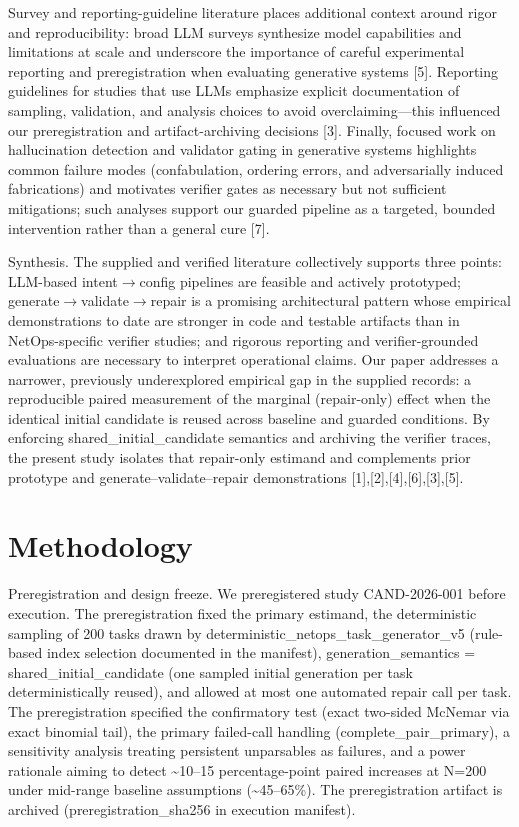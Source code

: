 \documentclass[conference]{IEEEtran}
\begin{document}
Survey and reporting-guideline literature places additional context around rigor and reproducibility: broad LLM surveys synthesize model capabilities and limitations at scale and underscore the importance of careful experimental reporting and preregistration when evaluating generative systems [5]. Reporting guidelines for studies that use LLMs emphasize explicit documentation of sampling, validation, and analysis choices to avoid overclaiming---this influenced our preregistration and artifact-archiving decisions [3]. Finally, focused work on hallucination detection and validator gating in generative systems highlights common failure modes (confabulation, ordering errors, and adversarially induced fabrications) and motivates verifier gates as necessary but not sufficient mitigations; such analyses support our guarded pipeline as a targeted, bounded intervention rather than a general cure [7].

Synthesis. The supplied and verified literature collectively supports three points: LLM-based intent\ensuremath{\rightarrow}config pipelines are feasible and actively prototyped; generate\ensuremath{\rightarrow}validate\ensuremath{\rightarrow}repair is a promising architectural pattern whose empirical demonstrations to date are stronger in code and testable artifacts than in NetOps-specific verifier studies; and rigorous reporting and verifier-grounded evaluations are necessary to interpret operational claims. Our paper addresses a narrower, previously underexplored empirical gap in the supplied records: a reproducible paired measurement of the marginal (repair-only) effect when the identical initial candidate is reused across baseline and guarded conditions. By enforcing shared\_initial\_candidate semantics and archiving the verifier traces, the present study isolates that repair-only estimand and complements prior prototype and generate--validate--repair demonstrations [1],[2],[4],[6],[3],[5].

\section{Methodology}
Preregistration and design freeze. We preregistered study CAND-2026-001 before execution. The preregistration fixed the primary estimand, the deterministic sampling of 200 tasks drawn by deterministic\_netops\_task\_generator\_v5 (rule-based index selection documented in the manifest), generation\_semantics = shared\_initial\_candidate (one sampled initial generation per task deterministically reused), and allowed at most one automated repair call per task. The preregistration specified the confirmatory test (exact two-sided McNemar via exact binomial tail), the primary failed-call handling (complete\_pair\_primary), a sensitivity analysis treating persistent unparsables as failures, and a power rationale aiming to detect \textasciitilde{}10--15 percentage-point paired increases at N=200 under mid-range baseline assumptions (\textasciitilde{}45--65\%). The preregistration artifact is archived (preregistration\_sha256 in execution manifest).
\end{document}
